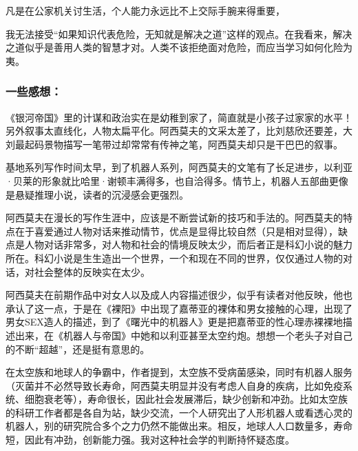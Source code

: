 凡是在公家机关讨生活，个人能力永远比不上交际手腕来得重要，

我无法接受“如果知识代表危险，无知就是解决之道”这样的观点。在我看来，解决之道似乎是善用人类的智慧才对。人类不该拒绝面对危险，而应当学习如何化险为夷。

\subsubsection{一些感想：}
《银河帝国》里的计谋和政治实在是幼稚到家了，简直就是小孩子过家家的水平！另外叙事太直线化，人物太扁平化。阿西莫夫的文采太差了，比刘慈欣还要差，大刘最起码景物描写一笔带过却常常有传神之笔，阿西莫夫却只是干巴巴的叙事。

基地系列写作时间太早，到了机器人系列，阿西莫夫的文笔有了长足进步，以利亚·贝莱的形象就比哈里·谢顿丰满得多，也自洽得多。情节上，机器人五部曲更像是悬疑推理小说，读者的沉浸感会更强烈。

阿西莫夫在漫长的写作生涯中，应该是不断尝试新的技巧和手法的。阿西莫夫的特点在于喜爱通过人物对话来推动情节，优点是显得比较自然（只是相对显得），缺点是人物对话非常多，对人物和社会的情境反映太少，而后者正是科幻小说的魅力所在。科幻小说是生生造出一个世界，一个和现在不同的世界，仅仅通过人物的对话，对社会整体的反映实在太少。 

阿西莫夫在前期作品中对女人以及成人内容描述很少，似乎有读者对他反映，他也承认了这一点，于是在《裸阳》中出现了嘉蒂亚的裸体和男女接触的心理，出现了男女SEX造人的描述，到了《曙光中的机器人》更是把嘉蒂亚的性心理赤裸裸地描述出来，在《机器人与帝国》中她和以利亚甚至太空约炮。想想一个老头子对自己的不断“超越”，还是挺有意思的。

在太空族和地球人的争霸中，作者提到，太空族不受病菌感染，同时有机器人服务（灭菌并不必然导致长寿命，阿西莫夫明显并没有考虑人自身的疾病，比如免疫系统、细胞衰老等），寿命很长，因此社会发展滞后，缺少创新和冲劲。比如太空族的科研工作者都是各自为站，缺少交流，一个人研究出了人形机器人或看透心灵的机器人，别的研究院合多个之力仍然不能做出来。相反，地球人人口数量多，寿命短，因此有冲劲，创新能力强。我对这种社会学的判断持怀疑态度。